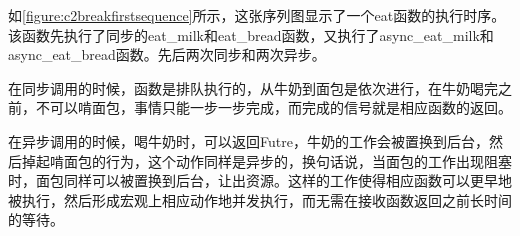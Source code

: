 如\autoref{figure:c2breakfirstsequence}所示，这张序列图显示了一个eat函数的执行时序。该函数先执行了同步的eat\_milk和eat\_bread函数，又执行了async\_eat\_milk和async\_eat\_bread函数。先后两次同步和两次异步。

在同步调用的时候，函数是排队执行的，从牛奶到面包是依次进行，在牛奶喝完之前，不可以啃面包，事情只能一步一步完成，而完成的信号就是相应函数的返回。

在异步调用的时候，喝牛奶时，可以返回Futre，牛奶的工作会被置换到后台，然后掉起啃面包的行为，这个动作同样是异步的，换句话说，当面包的工作出现阻塞时，面包同样可以被置换到后台，让出资源。这样的工作使得相应函数可以更早地被执行，然后形成宏观上相应动作地并发执行，而无需在接收函数返回之前长时间的等待。
